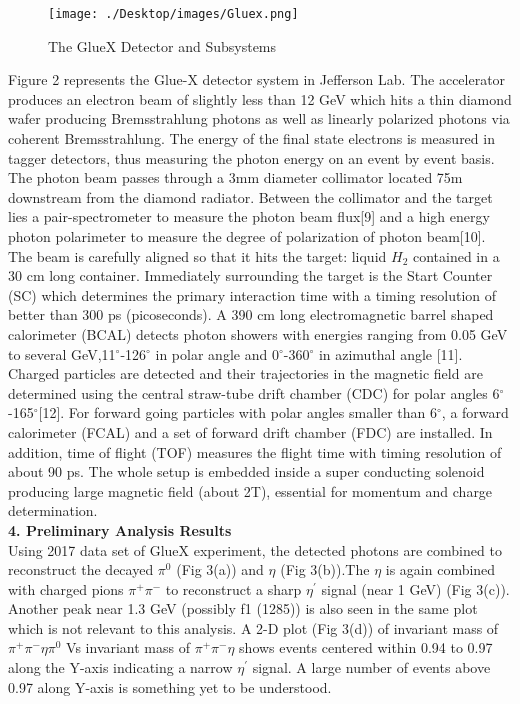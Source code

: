 \documentclass[11pt]{article}
\begin{document}
\begin{figure}
  \texttt{[image: ./Desktop/images/Gluex.png]}
  \caption{The GlueX Detector and Subsystems}
  \label{fig:boat1}
\end{figure}

Figure 2 represents the Glue-X detector system in Jefferson Lab. 
The accelerator produces an electron beam of slightly less than 12 GeV which hits a thin diamond wafer producing Bremsstrahlung photons as well as linearly polarized photons via coherent Bremsstrahlung.
 The energy of the final state electrons is measured in tagger detectors, thus measuring the photon energy on an event by event basis.
 The photon beam passes through a 3mm diameter collimator located 75m downstream from the diamond radiator.
 Between the collimator and the target lies a pair-spectrometer to measure the photon beam flux[9] and a high energy photon polarimeter to measure the degree of polarization of photon beam[10].
  The beam is carefully aligned so that it hits the target: liquid $H_{2}$ contained in a 30 cm long container.
   Immediately surrounding the target is the Start Counter (SC) which determines the primary interaction time with a timing resolution of better than 300 ps (picoseconds).
    A 390 cm long electromagnetic barrel shaped calorimeter (BCAL) detects photon showers with energies ranging from 0.05 GeV to several GeV,11$^{\circ}$-126$^{\circ}$ in polar angle and 0$^{\circ}$-360$^{\circ}$ in azimuthal angle [11].
     Charged particles are detected and their trajectories in the magnetic field are determined using the central straw-tube drift chamber (CDC) for polar angles 6$^{\circ}$-165$^{\circ}$[12]. For forward going particles with polar angles smaller than 6$^{\circ}$, a forward calorimeter (FCAL) and a set of forward drift chamber (FDC) are installed.
  In addition, time of flight (TOF)  measures the flight time with timing resolution of about 90 ps. 
The whole setup is embedded inside a super conducting solenoid producing large magnetic field (about 2T), essential for momentum and charge determination.\\

\textbf{4.	Preliminary Analysis Results}\\







Using  2017 data set of GlueX experiment, the detected photons are combined to reconstruct the decayed $ \pi^{0}$  (Fig 3(a)) and $\eta$ (Fig 3(b)).The $\eta$  is again combined with charged pions $\pi^{+} \pi^{-}$  to reconstruct a sharp $ \eta^{'}$  signal (near 1 GeV) (Fig 3(c)). Another peak near 1.3 GeV (possibly f1 (1285)) is also seen in the same plot which is not relevant to this analysis. A 2-D plot (Fig 3(d)) of invariant mass of $\pi^{+}\pi^{-} \eta \pi^{0}$ Vs invariant mass of $\pi^{+} \pi^{-} \eta$ shows events centered within 0.94 to 0.97 along the Y-axis indicating a narrow $\eta^{'}$ signal. A large number of events above 0.97 along Y-axis is something yet to be understood.
\end{document}
